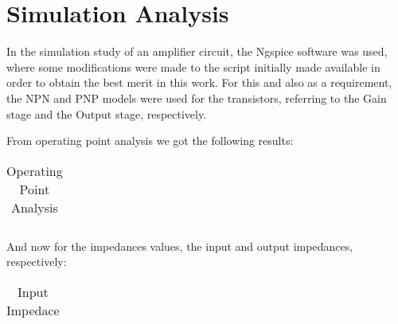 \section{Simulation Analysis}
\label{sec:simulation} 

In the simulation study of an amplifier circuit, the Ngspice software was used, where some modifications were made to the script initially made available in order to obtain the best merit in this work. For this and also as a requirement, the NPN and PNP models were used for the transistors, referring to the Gain stage and the Output stage, respectively.

From operating point analysis we got the following results:
\FloatBarrier
\begin{table}[h]
  \centering
  \begin{tabular}{|c|c|c|c|c|}
    \hline    
    
    \hline
  \end{tabular}
  \caption{Operating Point Analysis}
  \label{tab:Spice1}
\end{table}
\FloatBarrier  

And now for the impedances values, the input and output impedances, respectively:

\FloatBarrier
\begin{table}[h]
  \centering
  \begin{tabular}{|c|}
    \hline    
    
    \hline
  \end{tabular}
  \caption{Input Impedace}
  \label{tab:Spice1}
\end{table}
\FloatBarrier   

%    




